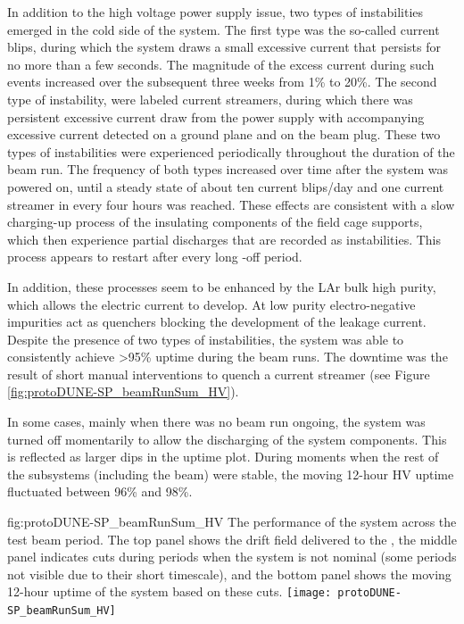 In addition to the high voltage power supply issue, two types of instabilities emerged in the cold side of the  system. The first type was the so-called current blips, during which the system draws a small excessive current that persists for no more than a few seconds. The magnitude of the excess current during such events increased over the subsequent three weeks from 1\% to 20\%. The second type of instability, were labeled current streamers, during which there was persistent excessive current draw from the  power supply with accompanying excessive current detected on a ground plane and on the beam plug. These two types of instabilities were experienced periodically throughout the duration of the  beam run. The frequency of both types increased over time after the system was powered on, until a steady state of about ten current blips/day and one current streamer in every four hours was reached. These effects are consistent with a slow charging-up process of the insulating components of the field cage supports, which then experience partial discharges that are recorded as  instabilities. This process appears to restart after every long -off period. 

In addition, these processes seem to be enhanced by the LAr bulk high purity, which allows the electric current to develop. At low purity electro-negative impurities act as quenchers blocking the development of the leakage current. Despite the presence of two types of instabilities, the  system was able to consistently achieve >95\% uptime during the beam runs. The downtime was the result of short manual interventions to quench a current streamer (see Figure \ref{fig:protoDUNE-SP_beamRunSum_HV}).

In some cases, mainly when there was no beam run ongoing, the  system was turned off momentarily to allow the discharging of the  system components. This is reflected as larger dips in the uptime plot. During moments when the rest of the subsystems (including the beam) were stable, the moving 12-hour HV uptime fluctuated between 96\% and 98\%.



\begin{dunefigure}
{fig:protoDUNE-SP_beamRunSum_HV}
{The performance of the  system across the test beam period. The top panel shows the drift field delivered to the , the middle panel indicates  cuts during periods when the system is not nominal (some periods not visible due to their short timescale), and the bottom panel shows the moving 12-hour uptime of the  system based on these  cuts.}
\texttt{[image: protoDUNE-SP\_beamRunSum\_HV]}
\end{dunefigure}

